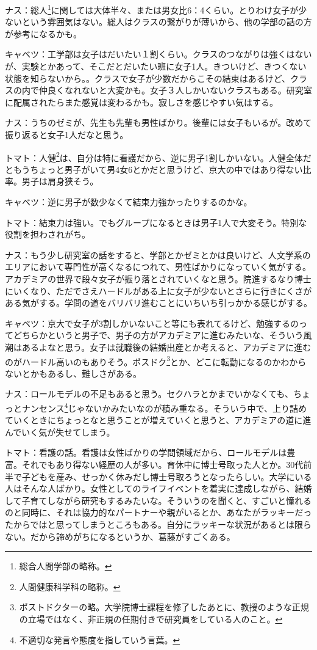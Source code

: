 ナス：総人\footnote[1]{総合人間学部の略称。}に関しては大体半々、または男女比6：4くらい。とりわけ女子が少ないという雰囲気はない。総人はクラスの繋がりが薄いから、他の学部の話の方が参考になるかも。

キャベツ：工学部は女子はだいたい１割くらい。クラスのつながりは強くはないが、実験とかあって、そこだとだいたい班に女子1人。きついけど、きつくない状態を知らないから。。クラスで女子が少数だからこその結束はあるけど、クラスの内で仲良くなれないと大変かも。女子３人しかいないクラスもある。研究室に配属されたらまた感覚は変わるかも。寂しさを感じやすい気はする。

ナス：うちのゼミが、先生も先輩も男性ばかり。後輩には女子もいるが。改めて振り返ると女子1人だなと思う。

トマト：人健\footnote[2]{人間健康科学科の略称。}は、自分は特に看護だから、逆に男子1割しかいない。人健全体だともうちょっと男子がいて男4女6とかだと思うけど、京大の中ではあり得ない比率。男子は肩身狭そう。

キャベツ：逆に男子が数少なくて結束力強かったりするのかな。

トマト：結束力は強い。でもグループになるときは男子1人で大変そう。特別な役割を担わされがち。

ナス：もう少し研究室の話をすると、学部とかゼミとかは良いけど、人文学系のエリアにおいて専門性が高くなるにつれて、男性ばかりになっていく気がする。アカデミアの世界で段々女子が振り落とされていくなと思う。院進するなり博士にいくなり、ただでさえハードルがある上に女子が少ないとさらに行きにくさがある気がする。学問の道をバリバリ進むことにいちいち引っかかる感じがする。

キャベツ：京大で女子が3割しかいないこと等にも表れてるけど、勉強するのってどちらかというと男子で、男子の方がアカデミアに進むみたいな、そういう風潮はあるよなと思う。女子は就職後の結婚出産とか考えると、アカデミアに進むのがハードル高いのもありそう。ポスドク\footnote[3]{ポストドクターの略。大学院博士課程を修了したあとに、教授のような正規の立場ではなく、非正規の任期付きで研究員をしている人のこと。}とか、どこに転勤になるのかわからないとかもあるし、難しさがある。

ナス：ロールモデルの不足もあると思う。セクハラとかまでいかなくても、ちょっとナンセンス\footnote[4]{ 不適切な発言や態度を指していう言葉。}じゃないかみたいなのが積み重なる。そういう中で、上り詰めていくときにちょっとなと思うことが増えていくと思うと、アカデミアの道に進んでいく気が失せてしまう。

トマト：看護の話。看護は女性ばかりの学問領域だから、ロールモデルは豊富。それでもあり得ない経歴の人が多い。育休中に博士号取った人とか。30代前半で子どもを産み、せっかく休みだし博士号取ろうとなったらしい。大学にいる人はそんな人ばかり。女性としてのライフイベントを着実に達成しながら、結婚して子育てしながら研究もするみたいな。そういうのを聞くと、すごいと憧れるのと同時に、それは協力的なパートナーや親がいるとか、あなたがラッキーだったからではと思ってしまうところもある。自分にラッキーな状況があるとは限らない。だから諦めがちになるというか、葛藤がすごくある。

